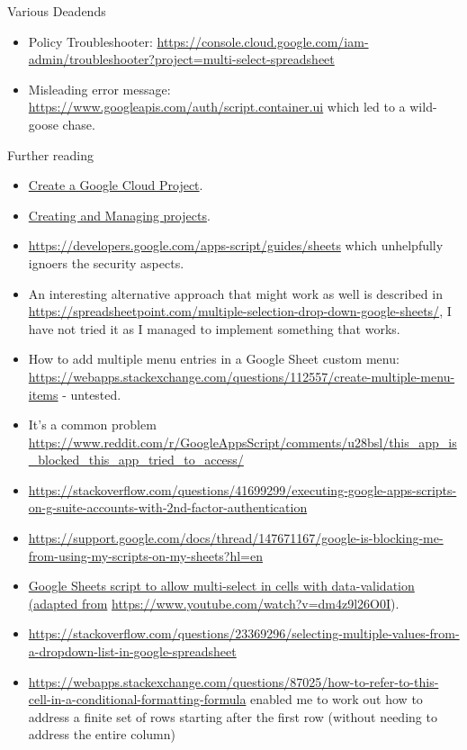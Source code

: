 Various Deadends
\begin{itemize}
    \item Policy Troubleshooter: \url{https://console.cloud.google.com/iam-admin/troubleshooter?project=multi-select-spreadsheet}
    \item Misleading error message: \url{https://www.googleapis.com/auth/script.container.ui} which led to a wild-goose chase.
\end{itemize}

Further reading
\begin{itemize}
    \item \href{https://developers.google.com/workspace/guides/create-project}{Create a Google Cloud Project}.
    \item \href{https://cloud.google.com/resource-manager/docs/creating-managing-projects}{Creating and Managing projects}.
    \item \url{https://developers.google.com/apps-script/guides/sheets} which unhelpfully ignoers the security aspects.
    \item An interesting alternative approach that might work as well is described in \url{https://spreadsheetpoint.com/multiple-selection-drop-down-google-sheets/}, I have not tried it as I managed to implement something that works.
    \item How to add multiple menu entries in a Google Sheet custom menu: \url{https://webapps.stackexchange.com/questions/112557/create-multiple-menu-items} - untested.
    \item It's a common problem \url{https://www.reddit.com/r/GoogleAppsScript/comments/u28bsl/this_app_is_blocked_this_app_tried_to_access/}
    \item \url{https://stackoverflow.com/questions/41699299/executing-google-apps-scripts-on-g-suite-accounts-with-2nd-factor-authentication}
    \item \url{https://support.google.com/docs/thread/147671167/google-is-blocking-me-from-using-my-scripts-on-my-sheets?hl=en}
    \item \href{https://gist.github.com/coinsandsteeldev/4c67dfa5411e8add913273fc5a30f5e7}{Google Sheets script to allow multi-select in cells with data-validation (adapted from} \url{https://www.youtube.com/watch?v=dm4z9l26O0I}).
    \item \url{https://stackoverflow.com/questions/23369296/selecting-multiple-values-from-a-dropdown-list-in-google-spreadsheet}
    \item \url{https://webapps.stackexchange.com/questions/87025/how-to-refer-to-this-cell-in-a-conditional-formatting-formula} enabled me to work out how to address a finite set of rows starting after the first row (without needing to address the entire column)
\end{itemize}